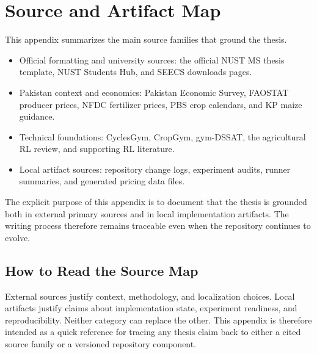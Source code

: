 \chapter{Source and Artifact Map}

This appendix summarizes the main source families that ground the thesis.
\begin{itemize}[leftmargin=1.2cm]
    \item Official formatting and university sources: the official NUST MS thesis template, NUST Students Hub, and SEECS downloads pages.
    \item Pakistan context and economics: Pakistan Economic Survey, FAOSTAT producer prices, NFDC fertilizer prices, PBS crop calendars, and KP maize guidance.
    \item Technical foundations: CyclesGym, CropGym, gym-DSSAT, the agricultural RL review, and supporting RL literature.
    \item Local artifact sources: repository change logs, experiment audits, runner summaries, and generated pricing data files.
\end{itemize}

The explicit purpose of this appendix is to document that the thesis is grounded both in external primary sources and in local implementation artifacts. The writing process therefore remains traceable even when the repository continues to evolve.



\section{How to Read the Source Map}

External sources justify context, methodology, and localization choices. Local artifacts justify claims about implementation state, experiment readiness, and reproducibility. Neither category can replace the other. This appendix is therefore intended as a quick reference for tracing any thesis claim back to either a cited source family or a versioned repository component.
